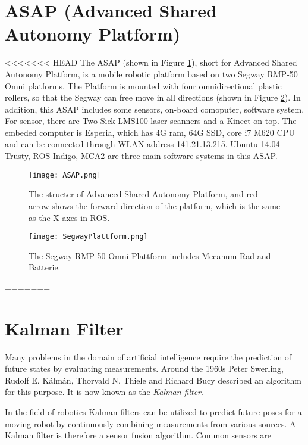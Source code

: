 \section{ASAP (Advanced Shared Autonomy Platform)}
<<<<<<< HEAD
The ASAP (shown in Figure \ref{ASAP}), short for Advanced Shared Autonomy Platform, is a mobile robotic platform based on two Segway RMP-50 Omni platforms. The Platform is mounted with four omnidirectional plastic rollers, so that the Segway can free move in all directions (shown in Figure \ref{Omni}). In addition, this ASAP includes some sensors, on-board comoputer, software system. For sensor, there are Two Sick LMS100 laser scanners and a Kinect on top. The embeded computer is Esperia, which has 4G ram, 64G SSD, core i7 M620 CPU and can be connected through WLAN address 141.21.13.215. Ubuntu 14.04 Trusty, ROS Indigo, MCA2 are three main software systems in this ASAP.

\begin{figure}[thpb]
      \centering
      \texttt{[image: ASAP.png]}
      \caption{The structer of Advanced Shared Autonomy Platform, and red arrow shows the forward direction of the platform, which is the same as the X axes in ROS.}
      \label{ASAP}
   \end{figure}

\begin{figure}[thpb]
      \centering
      \texttt{[image: SegwayPlattform.png]}
      \caption{The Segway RMP-50 Omni Plattform includes Mecanum-Rad and Batterie.}
      \label{Omni}
   \end{figure}
=======

\section{Kalman Filter}
Many problems in the domain of artificial intelligence require the prediction of future states by evaluating measurements. Around the 1960s Peter Swerling, Rudolf E. Kálmán, Thorvald N. Thiele and Richard Bucy described an algorithm for this purpose. It is now known as the \textit{Kalman filter}.

In the field of robotics Kalman filters can be utilized to predict future poses for a moving robot by continuously combining measurements from various sources. A Kalman filter is therefore a sensor fusion algorithm. Common sensors are
 
